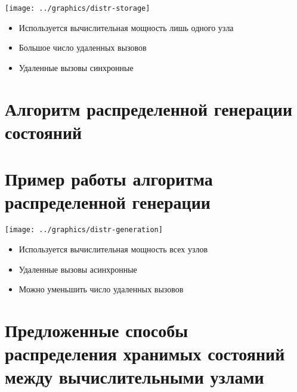 \documentclass[12pt]{article}
\begin{document}
\begin{minipage}[m]{0.5\linewidth}
  \texttt{[image: ../graphics/distr-storage]}
\end{minipage}
\begin{minipage}[m]{0.5\linewidth}
  \begin{flushleft}
    \begin{itemize}
    \item Используется вычислительная мощность лишь одного узла
    \item Большое число удаленных вызовов
    \item Удаленные вызовы синхронные
    \end{itemize}
  \end{flushleft}
\end{minipage}

\section{Алгоритм распределенной генерации состояний}
\label{sec:distr-generation}



\section{Пример работы алгоритма распределенной генерации}
\label{sec:distr-generation2}

\begin{minipage}[m]{0.55\linewidth}
  \texttt{[image: ../graphics/distr-generation]}
\end{minipage}
\begin{minipage}[m]{0.45\linewidth}
  \begin{flushleft}
    \begin{itemize}
    \item Используется вычислительная мощность всех узлов
    \item Удаленные вызовы асинхронные
    \item Можно уменьшить число удаленных вызовов
    \end{itemize}
  \end{flushleft}
\end{minipage}

\section{Предложенные способы распределения хранимых состояний между вычислительными узлами}
\label{sec:state-partitioning}
\end{document}
